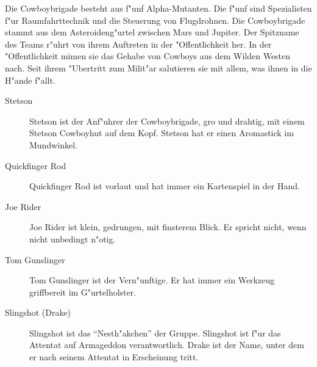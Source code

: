 
Die Cowboybrigade besteht aus f"unf Alpha-Mutanten. Die f"unf sind Spezialisten f"ur Raumfahrttechnik und die Steuerung von Flugdrohnen. 
Die Cowboybrigade stammt aus dem Asteroideng"urtel zwischen Mars und Jupiter. Der Spitzname des Teams r"uhrt von ihrem Auftreten in der "Offentlichkeit her. In der "Offentlichkeit mimen sie das Gehabe von Cowboys aus dem Wilden Westen nach. Seit ihrem "Ubertritt zum Milit"ar salutieren sie mit allem, was ihnen in die H"ande f"allt.

\begin{description}
    \item[Stetson] Stetson ist der Anf"uhrer der Cowboybrigade, gro\3 und drahtig, mit einem Stetson Cowboyhut auf dem Kopf. Stetson hat er 
        einen Aromastick im Mundwinkel.
    \item[Quickfinger Rod] Quickfinger Rod ist vorlaut und hat immer ein Kartenspiel in der Hand.
    \item[Joe Rider] Joe Rider ist klein, gedrungen, mit finsterem Blick. Er spricht nicht, wenn nicht unbedingt n"otig.
    \item[Tom Gunslinger] Tom Gunslinger ist der Vern"unftige. Er hat immer ein Werkzeug griffbereit im G"urtelholster.
    \item[Slingshot (Drake)]  Slingshot ist das ``Nesth"akchen'' der Gruppe. Slingshot ist f"ur das Attentat auf Armageddon verantwortlich. 
        Drake ist der Name, unter dem er nach seinem Attentat in Erscheinung tritt.
\end{description}

\newpage
